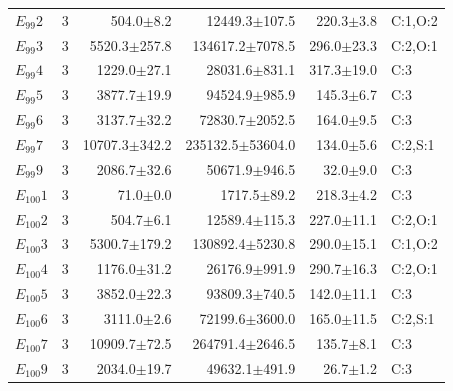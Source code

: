 \begin{supertabular}{@{}lrrrrl@{}}
$E_{99}2$ & 3 & 504.0$\pm$8.2 & 12449.3$\pm$107.5 & 220.3$\pm$3.8 & C:1,O:2 \\
$E_{99}3$ & 3 & 5520.3$\pm$257.8 & 134617.2$\pm$7078.5 & 296.0$\pm$23.3 & C:2,O:1 \\
$E_{99}4$ & 3 & 1229.0$\pm$27.1 & 28031.6$\pm$831.1 & 317.3$\pm$19.0 & C:3 \\
$E_{99}5$ & 3 & 3877.7$\pm$19.9 & 94524.9$\pm$985.9 & 145.3$\pm$6.7 & C:3 \\
$E_{99}6$ & 3 & 3137.7$\pm$32.2 & 72830.7$\pm$2052.5 & 164.0$\pm$9.5 & C:3 \\
$E_{99}7$ & 3 & 10707.3$\pm$342.2 & 235132.5$\pm$53604.0 & 134.0$\pm$5.6 & C:2,S:1 \\
$E_{99}9$ & 3 & 2086.7$\pm$32.6 & 50671.9$\pm$946.5 & 32.0$\pm$9.0 & C:3 \\
$E_{100}1$ & 3 & 71.0$\pm$0.0 & 1717.5$\pm$89.2 & 218.3$\pm$4.2 & C:3 \\
$E_{100}2$ & 3 & 504.7$\pm$6.1 & 12589.4$\pm$115.3 & 227.0$\pm$11.1 & C:2,O:1 \\
$E_{100}3$ & 3 & 5300.7$\pm$179.2 & 130892.4$\pm$5230.8 & 290.0$\pm$15.1 & C:1,O:2 \\
$E_{100}4$ & 3 & 1176.0$\pm$31.2 & 26176.9$\pm$991.9 & 290.7$\pm$16.3 & C:2,O:1 \\
$E_{100}5$ & 3 & 3852.0$\pm$22.3 & 93809.3$\pm$740.5 & 142.0$\pm$11.1 & C:3 \\
$E_{100}6$ & 3 & 3111.0$\pm$2.6 & 72199.6$\pm$3600.0 & 165.0$\pm$11.5 & C:2,S:1 \\
$E_{100}7$ & 3 & 10909.7$\pm$72.5 & 264791.4$\pm$2646.5 & 135.7$\pm$8.1 & C:3 \\
$E_{100}9$ & 3 & 2034.0$\pm$19.7 & 49632.1$\pm$491.9 & 26.7$\pm$1.2 & C:3 \\
\end{supertabular}
\endgroup
